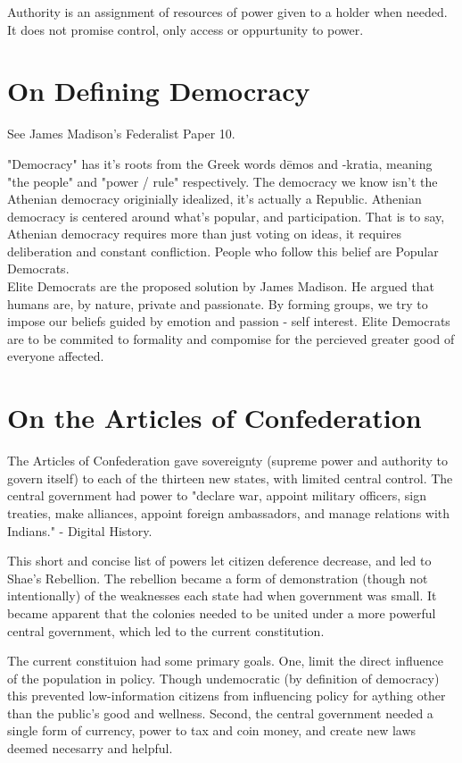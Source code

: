\documentclass{article}
\begin{document}
Authority is an assignment of resources of power given to a holder when needed. It does not promise control, only access or oppurtunity to power.

\section{On Defining Democracy}
See James Madison's Federalist Paper 10.

"Democracy" has it's roots from the Greek words d\={e}mos and -kratia, meaning "the people" and "power / rule" respectively. The democracy we know isn't the Athenian democracy originially idealized, it's actually a Republic. Athenian democracy is centered around what's popular, and participation. That is to say, Athenian democracy requires more than just voting on ideas, it requires deliberation and constant confliction. People who follow this belief are Popular Democrats.\\

Elite Democrats are the proposed solution by James Madison. He argued that humans are, by nature, private and passionate. By forming groups, we try to impose our beliefs guided by emotion and passion - self interest. Elite Democrats are to be commited to formality and compomise for the percieved greater good of everyone affected.

\section{On the Articles of Confederation}
The Articles of Confederation gave sovereignty (supreme power and authority to govern itself) to each of the thirteen new states, with limited central control. The central government had power to "declare war, appoint military officers, sign treaties, make alliances, appoint foreign ambassadors, and manage relations with Indians." - Digital History.

This short and concise list of powers let citizen deference decrease, and led to Shae's Rebellion. The rebellion became a form of demonstration (though not intentionally) of the weaknesses each state had when government was small. It became apparent that the colonies needed to be united under a more powerful central government, which led to the current constitution.

The current constituion had some primary goals. One, limit the direct influence of the population in policy. Though undemocratic (by definition of democracy) this prevented low-information citizens from influencing policy for aything other than the public's good and wellness. Second, the central government needed a single form of currency, power to tax and coin money, and create new laws deemed necesarry and helpful.
\end{document}
